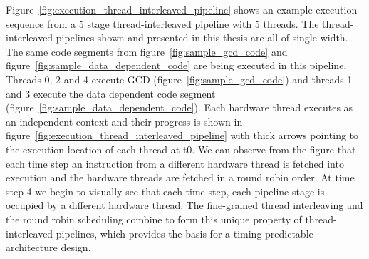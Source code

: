 Figure~\ref{fig:execution_thread_interleaved_pipeline} shows an example execution sequence from a 5 stage thread-interleaved pipeline with 5 threads.
The thread-interleaved pipelines shown and presented in this thesis are all of single width.
The same code segments from figure~\ref{fig:sample_gcd_code} and figure~\ref{fig:sample_data_dependent_code} are being executed in this pipeline. 
Threads 0, 2 and 4 execute GCD (figure~\ref{fig:sample_gcd_code}) and threads 1 and 3 execute the data dependent code segment (figure~\ref{fig:sample_data_dependent_code}).
Each hardware thread executes as an independent context and their progress is shown in figure~\ref{fig:execution_thread_interleaved_pipeline} with thick arrows pointing to the execution location of each thread at t0.
We can observe from the figure that each time step an instruction from a different hardware thread is fetched into execution and the hardware threads are fetched in a round robin order.
At time step 4 we begin to visually see that each time step, each pipeline stage is occupied by a different hardware thread.
The fine-grained thread interleaving and the round robin scheduling combine to form this unique property of thread-interleaved pipelines, which provides the basis for a timing predictable architecture design.

